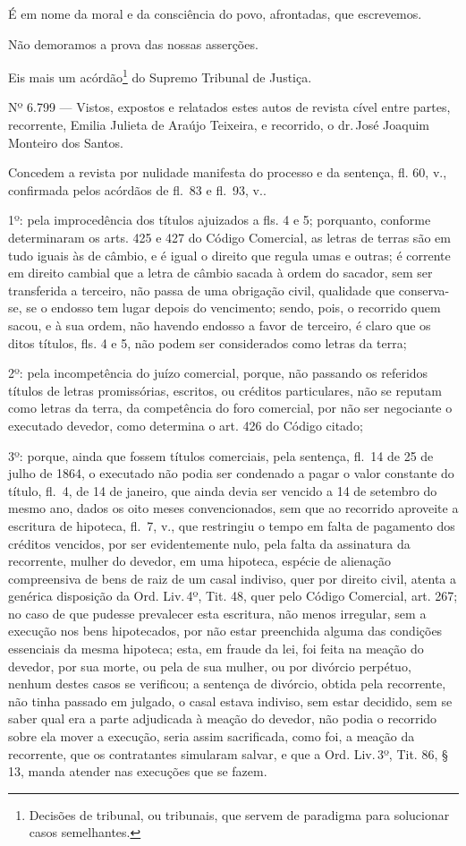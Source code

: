 É em nome da moral e da consciência do povo, afrontadas, que escrevemos.

Não demoramos a prova das nossas asserções.

Eis mais um acórdão\footnote{Decisões de tribunal, ou tribunais, que
  servem de paradigma para solucionar casos semelhantes.} do Supremo
Tribunal de Justiça.

Nº 6.799 --- Vistos, expostos e relatados estes autos de revista cível
entre partes, recorrente, Emilia Julieta de Araújo Teixeira, e
recorrido, o dr.\,José Joaquim Monteiro dos Santos.

Concedem a revista por nulidade manifesta do processo e da sentença, fl.
60, v., confirmada pelos acórdãos de fl.~83 e fl.~93, v..

1º: pela improcedência dos títulos ajuizados a fls. 4 e 5; porquanto,
conforme determinaram os arts. 425 e 427 do Código Comercial, as letras
de terras são em tudo iguais às de câmbio, e é igual o direito que
regula umas e outras; é corrente em direito cambial que a letra de
câmbio sacada à ordem do sacador, sem ser transferida a terceiro, não
passa de uma obrigação civil, qualidade que conserva-se, se o endosso
tem lugar depois do vencimento; sendo, pois, o recorrido quem sacou, e à
sua ordem, não havendo endosso a favor de terceiro, é claro que os ditos
títulos, fls. 4 e 5, não podem ser considerados como letras da terra;

2º: pela incompetência do juízo comercial, porque, não passando os
referidos títulos de letras promissórias, escritos, ou créditos
particulares, não se reputam como letras da terra, da competência do
foro comercial, por não ser negociante o executado devedor, como
determina o art. 426 do Código citado;

3º: porque, ainda que fossem títulos comerciais, pela sentença, fl.~14
de 25 de julho de 1864, o executado não podia ser condenado a pagar o
valor constante do título, fl.~4, de 14 de janeiro, que ainda devia ser
vencido a 14 de setembro do mesmo ano, dados os oito meses
convencionados, sem que ao recorrido aproveite a escritura de hipoteca,
fl.~7, v., que restringiu o tempo em falta de pagamento dos créditos
vencidos, por ser evidentemente nulo, pela falta da assinatura da
recorrente, mulher do devedor, em uma hipoteca, espécie de alienação
compreensiva de bens de raiz de um casal indiviso, quer por direito
civil, atenta a genérica disposição da Ord. Liv.\,4º, Tit. 48, quer pelo
Código Comercial, art. 267; no caso de que pudesse prevalecer esta
escritura, não menos irregular, sem a execução nos bens hipotecados, por
não estar preenchida alguma das condições essenciais da mesma hipoteca;
esta, em fraude da lei, foi feita na meação do devedor, por sua morte,
ou pela de sua mulher, ou por divórcio perpétuo, nenhum destes casos se
verificou; a sentença de divórcio, obtida pela recorrente, não tinha
passado em julgado, o casal estava indiviso, sem estar decidido, sem se
saber qual era a parte adjudicada à meação do devedor, não podia o
recorrido sobre ela mover a execução, seria assim sacrificada, como foi,
a meação da recorrente, que os contratantes simularam salvar, e que a
Ord. Liv.\,3º, Tit. 86, § 13, manda atender nas execuções que se fazem.


